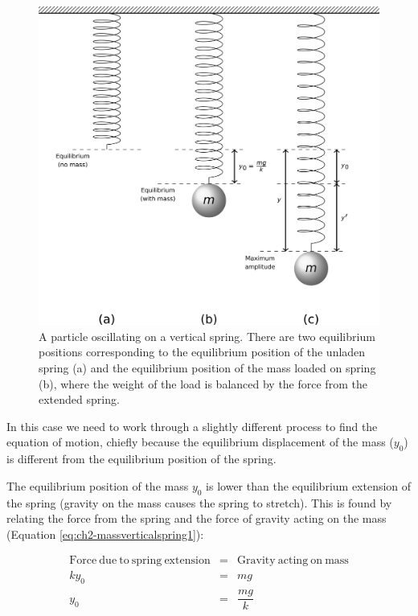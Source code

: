 \documentclass[
]{book}
\begin{document}
\begin{figure}

{\centering \includegraphics[width=0.7\linewidth]{visualisations/LaTeX/ch2-blocksonvertspring1} 

}

\caption{A particle oscillating on a vertical spring.  There are two equilibrium positions corresponding to the equilibrium position of the unladen spring (a) and the equilibrium position of the mass loaded on spring (b), where the weight of the load is balanced by the force from the extended spring.}\label{fig:ch2-massverticalspring1}
\end{figure}

In this case we need to work through a slightly different process to find the equation of motion, chiefly because the equilibrium displacement of the mass (\(y_0\)) is different from the equilibrium position of the spring.

The equilibrium position of the mass \(y_0\) is lower than the equilibrium extension of the spring (gravity on the mass causes the spring to stretch). This is found by relating the force from the spring and the force of gravity acting on the mass (Equation \eqref{eq:ch2-massverticalspring1}):

\begin{equation}
\begin{array}{rcl}
\mathrm{Force~due~to~spring~extension} &=& \mathrm{Gravity~acting~on~mass}\\
k y_0 &=& mg\\
y_0 &=& \dfrac{mg}{k}\\
\end{array}
\label{eq:ch2-massverticalspring1}
\end{equation}
\end{document}
